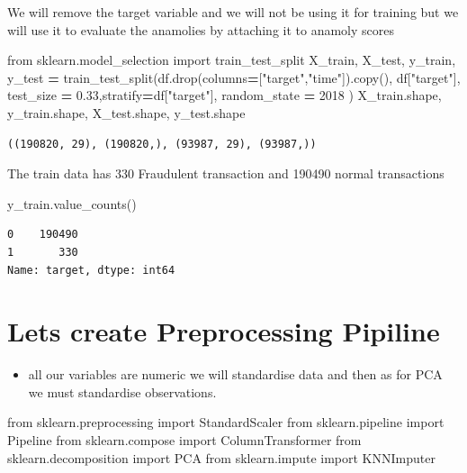\documentclass[
]{article}
\newenvironment{Shaded}{\begin{snugshade}}{\end{snugshade}}
\newcommand{\DecValTok}[1]{\textcolor[rgb]{0.00,0.00,0.81}{#1}}
\newcommand{\FloatTok}[1]{\textcolor[rgb]{0.00,0.00,0.81}{#1}}
\newcommand{\ImportTok}[1]{#1}
\newcommand{\NormalTok}[1]{#1}
\newcommand{\OperatorTok}[1]{\textcolor[rgb]{0.81,0.36,0.00}{\textbf{#1}}}
\newcommand{\StringTok}[1]{\textcolor[rgb]{0.31,0.60,0.02}{#1}}
\providecommand{\tightlist}{%
  \setlength{\itemsep}{0pt}\setlength{\parskip}{0pt}}
\begin{document}
We will remove the target variable and we will not be using it for
training but we will use it to evaluate the anamolies by attaching it to
anamoly scores

\begin{Shaded}
\begin{Highlighting}[]
\ImportTok{from}\NormalTok{ sklearn.model\_selection }\ImportTok{import}\NormalTok{ train\_test\_split}
\NormalTok{X\_train, X\_test, y\_train, y\_test }\OperatorTok{=}\NormalTok{  train\_test\_split(df.drop(columns}\OperatorTok{=}\NormalTok{[}\StringTok{"target"}\NormalTok{,}\StringTok{"time"}\NormalTok{]).copy(), df[}\StringTok{"target"}\NormalTok{], test\_size }\OperatorTok{=} \FloatTok{0.33}\NormalTok{,stratify}\OperatorTok{=}\NormalTok{df[}\StringTok{"target"}\NormalTok{],  random\_state }\OperatorTok{=} \DecValTok{2018}\NormalTok{ )}
\NormalTok{X\_train.shape, y\_train.shape, X\_test.shape, y\_test.shape}
\end{Highlighting}
\end{Shaded}

\begin{verbatim}
((190820, 29), (190820,), (93987, 29), (93987,))
\end{verbatim}

The train data has 330 Fraudulent transaction and 190490 normal
transactions

\begin{Shaded}
\begin{Highlighting}[]
\NormalTok{y\_train.value\_counts()}
\end{Highlighting}
\end{Shaded}

\begin{verbatim}
0    190490
1       330
Name: target, dtype: int64
\end{verbatim}

\hypertarget{lets-create-preprocessing-pipiline}{%
\section{Lets create Preprocessing
Pipiline}\label{lets-create-preprocessing-pipiline}}

\begin{itemize}
\tightlist
\item
  all our variables are numeric we will standardise data and then as for
  PCA we must standardise observations.
\end{itemize}

\begin{Shaded}
\begin{Highlighting}[]
\ImportTok{from}\NormalTok{ sklearn.preprocessing }\ImportTok{import}\NormalTok{ StandardScaler}
\ImportTok{from}\NormalTok{ sklearn.pipeline }\ImportTok{import}\NormalTok{ Pipeline}
\ImportTok{from}\NormalTok{ sklearn.compose }\ImportTok{import}\NormalTok{ ColumnTransformer}
\ImportTok{from}\NormalTok{ sklearn.decomposition }\ImportTok{import}\NormalTok{ PCA}
\ImportTok{from}\NormalTok{ sklearn.impute }\ImportTok{import}\NormalTok{ KNNImputer}
\end{Highlighting}
\end{Shaded}
\end{document}
